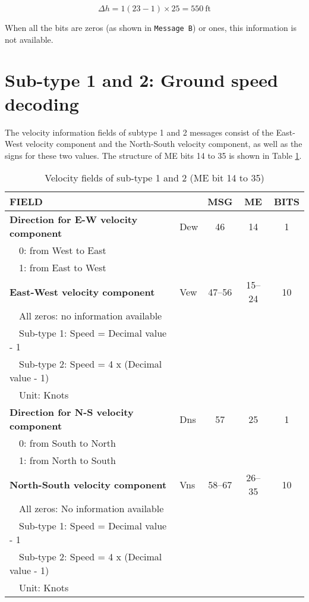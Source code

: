 \begin{equation}
  \Delta h = 1 (23 - 1) \times 25 = 550 ~\text{ft}
\end{equation}

When all the bits are zeros (as shown in \texttt{Message B}) or ones, this information is not available.


\section{Sub-type 1 and 2: Ground speed decoding}

The velocity information fields of subtype 1 and 2 messages consist of the East-West velocity component and the North-South velocity component, as well as the signs for these two values. The structure of ME bits 14 to 35 is shown in Table \ref{tb:adsb-velocity-bits-14-35-gs}.


\begin{table}[ht]
\caption{Velocity fields of sub-type 1 and 2 (ME bit 14 to 35)}
\label{tb:adsb-velocity-bits-14-35-gs}
\footnotesize
\begin{tabular}{|l|l|c|c|c|}
\hline
\textbf{FIELD} & & \textbf{MSG} & \textbf{ME} & \textbf{BITS} \\ \hline
\textbf{Direction for E-W velocity component} & Dew & 46 & 14 & 1\\
~~0: from West to East &&&&\\
~~1: from East to West &&&& \\ \hline
\textbf{East-West velocity component} & Vew & 47--56 & 15--24 & 10\\
~~All zeros: no information available &&&& \\
~~Sub-type 1: Speed = Decimal value - 1 &&&& \\
~~Sub-type 2: Speed = 4 x (Decimal value - 1) &&&& \\
~~Unit: Knots &&&& \\ \hline
\textbf{Direction for N-S velocity component} & Dns & 57 & 25 & 1 \\
~~0: from South to North &&&& \\
~~1: from North to South &&&& \\ \hline
\textbf{North-South velocity component} & Vns & 58--67 & 26--35 & 10\\
~~All zeros: No information available &&&&\\
~~Sub-type 1: Speed = Decimal value - 1 &&&&\\
~~Sub-type 2: Speed = 4 x (Decimal value - 1) &&&&\\
~~Unit: Knots &&&& \\ \hline
\end{tabular}
\end{table}

